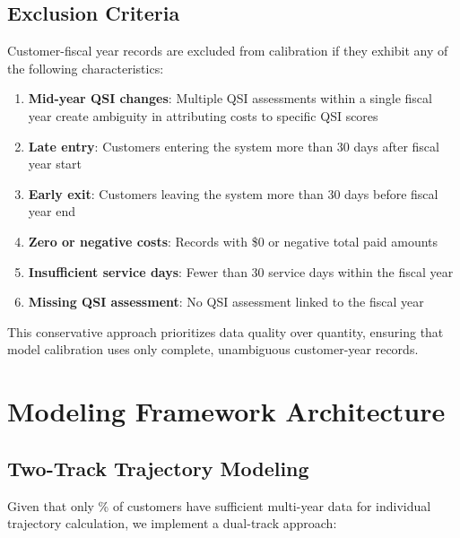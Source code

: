 \subsection{Exclusion Criteria}

Customer-fiscal year records are excluded from calibration if they exhibit any of the following characteristics:

\begin{enumerate}
    \item \textbf{Mid-year QSI changes}: Multiple QSI assessments within a single fiscal year create ambiguity in attributing costs to specific QSI scores
    \item \textbf{Late entry}: Customers entering the system more than 30 days after fiscal year start
    \item \textbf{Early exit}: Customers leaving the system more than 30 days before fiscal year end
    \item \textbf{Zero or negative costs}: Records with \$0 or negative total paid amounts
    \item \textbf{Insufficient service days}: Fewer than 30 service days within the fiscal year
    \item \textbf{Missing QSI assessment}: No QSI assessment linked to the fiscal year
\end{enumerate}

This conservative approach prioritizes data quality over quantity, ensuring that model calibration uses only complete, unambiguous customer-year records.




\section{Modeling Framework Architecture}

\subsection{Two-Track Trajectory Modeling}

Given that only \CustomerPctTwoPlusYear\% of customers have sufficient multi-year data for individual trajectory calculation, we implement a dual-track approach:

